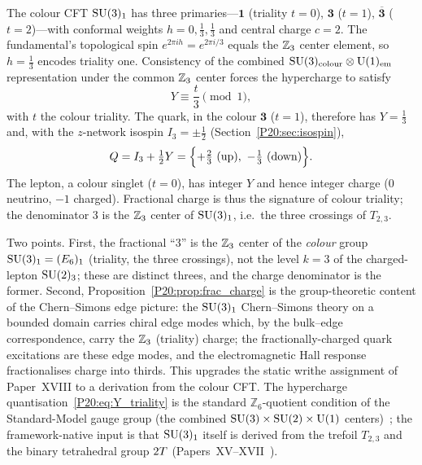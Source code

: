 \begin{proposition}
\label{P20:prop:frac_charge}
The colour CFT $\mathrm{SU}(3)_1$ has three primaries---$\mathbf{1}$
(triality $t=0$), $\mathbf{3}$ ($t=1$), $\overline{\mathbf{3}}$
($t=2$)---with conformal weights $h=0,\tfrac13,\tfrac13$ and central
charge $c=2$. The fundamental's topological spin
$e^{2\pi i h}=e^{2\pi i/3}$ equals the $\mathbb{Z}_3$ center element, so
$h=\tfrac13$ encodes triality one. Consistency of the combined
$\mathrm{SU}(3)_{\rm colour}\otimes\mathrm{U}(1)_{\rm em}$ representation under
the common $\mathbb{Z}_3$ center forces the hypercharge to satisfy
\begin{equation}
  Y\equiv \frac{t}{3}\pmod 1,
  \label{P20:eq:Y_triality}
\end{equation}
with $t$ the colour triality. The quark, in the colour $\mathbf{3}$
($t=1$), therefore has $Y=\tfrac13$ and, with the $z$-network isospin
$I_3=\pm\tfrac12$ (Section~\ref{P20:sec:isospin}),
\begin{equation}
  Q=I_3+\tfrac12 Y
   =\Bigl\{+\tfrac23\ (\text{up}),\ -\tfrac13\ (\text{down})\Bigr\}.
\end{equation}
The lepton, a colour singlet ($t=0$), has integer $Y$ and hence integer
charge ($0$ neutrino, $-1$ charged). Fractional charge is thus the
signature of colour triality; the denominator $3$ is the $\mathbb{Z}_3$
center of $\mathrm{SU}(3)_1$, i.e.\ the three crossings of $T_{2,3}$.
\end{proposition}

\begin{remark}
\label{P20:rem:charge_cs}
Two points. First, the fractional ``$3$'' is the $\mathbb{Z}_3$ center of the
\emph{colour} group $\mathrm{SU}(3)_1=(E_6)_1$ (triality, the three crossings),
not the level $k=3$ of the charged-lepton $\mathrm{SU}(2)_3$; these are distinct
threes, and the charge denominator is the former. Second,
Proposition~\ref{P20:prop:frac_charge} is the group-theoretic content of
the Chern--Simons edge picture: the $\mathrm{SU}(3)_1$ Chern--Simons theory on a
bounded domain carries chiral edge modes which, by the bulk--edge
correspondence, carry the $\mathbb{Z}_3$ (triality) charge; the
fractionally-charged quark excitations are these edge modes, and the
electromagnetic Hall response fractionalises charge into thirds. This
upgrades the static writhe assignment of Paper~XVIII to a derivation
from the colour CFT.
The hypercharge quantisation~\eqref{P20:eq:Y_triality} is the standard
$\mathbb{Z}_6$-quotient condition of the Standard-Model gauge group
(the combined $\mathrm{SU}(3)\times\mathrm{SU}(2)\times\mathrm{U}(1)$
centers)~\cite{FracCharge2024}; the framework-native input is that
$\mathrm{SU}(3)_1$ itself is derived from the trefoil $T_{2,3}$ and the binary
tetrahedral group $2T$
(Papers~XV--XVII~\cite{Paper15,Paper16,Paper17}).
\end{remark}

